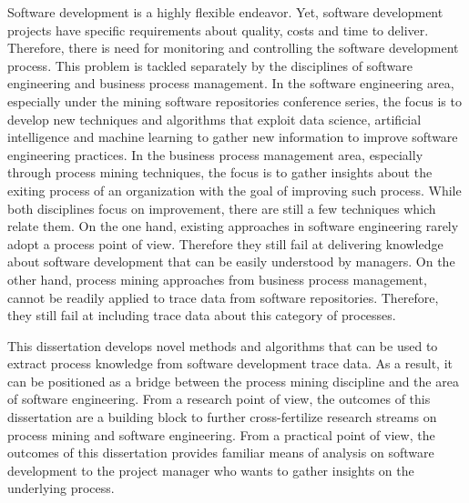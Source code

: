 



Software development is a highly flexible endeavor. Yet, software development projects
have specific requirements about quality, costs and time to deliver. Therefore, there is need
for monitoring and controlling the software development process. This problem is tackled
separately by the disciplines of software engineering and business process management. In the software engineering area, especially under the mining software repositories conference series, the focus is to develop new techniques and algorithms that exploit data science, artificial intelligence and machine learning to gather new information to improve software engineering practices. In the business process management area, especially through process mining techniques, the focus is to gather insights about the exiting process of an organization with the goal of improving such process. While both disciplines focus on improvement, there are still a few techniques which relate them. On the one hand, existing approaches in software engineering rarely adopt a process point of view. Therefore they still fail at delivering knowledge about software development that can be easily understood by managers. On the other hand, process mining approaches from business process management, cannot be readily applied to trace data from software repositories. Therefore, they still fail at including trace data about this category of processes. 
 
This dissertation develops novel methods and algorithms that can be used to extract process
knowledge from software development trace data. As a result, it can be positioned as a
bridge between the process mining discipline and the area of software engineering. From
a research point of view, the outcomes of this dissertation are a building block to further
cross-fertilize research streams on process mining and software engineering. From a practical
point of view, the outcomes of this dissertation provides familiar means of analysis on software development to the project manager who wants to gather insights on the underlying process.


%	

